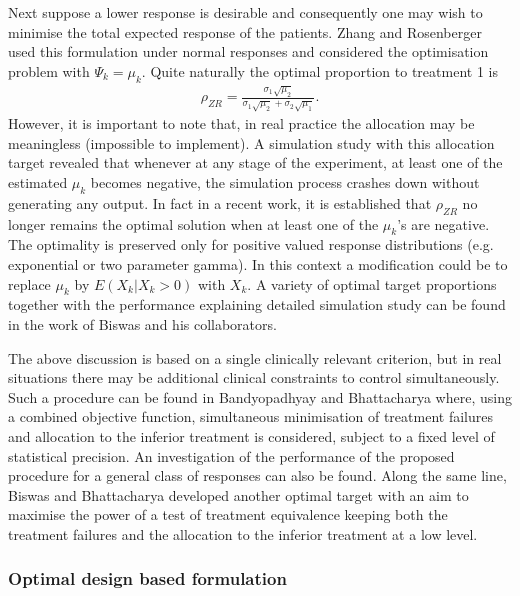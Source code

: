 Next suppose a lower response is desirable and consequently one may
wish to minimise the total expected response of the patients. Zhang
and Rosenberger\cite{24} used this formulation under normal responses
and considered the optimisation problem with $\Psi_{k}=\mu_{k}$.
Quite naturally the optimal proportion to treatment 1 is
\begin{eqnarray*}
\rho_{ZR}=\frac{\sigma_{1}\sqrt{\mu_{2}}}{\sigma_{1}\sqrt{\mu_{2}}+\sigma_{2}\sqrt{\mu_{1}}}.
\end{eqnarray*}
However, it is important to note that, in real practice the
allocation may be meaningless (impossible to implement). A simulation study with this allocation target revealed that  whenever at any stage of the experiment, at least one of
the estimated $\mu_{k}$ becomes negative, the simulation process crashes down without generating any output\cite{43}. In fact in a recent work\cite{32}, it is established that $\rho_{ZR}$
no longer remains the optimal solution when at least one of the
$\mu_{k}$'s are negative. The optimality is preserved only for positive valued response
distributions (e.g. exponential or two parameter gamma). In
this context a modification\cite{43} could be to replace $\mu_{k}$ by $E(X_{k}|X_{k}>0)$ with $X_{k}$. A variety of optimal target proportions together with the performance explaining detailed simulation study
can be found in the work of Biswas and his collaborators\cite{43}.

The above discussion is based on a single clinically relevant criterion, but in real situations there may be additional clinical constraints to control simultaneously. Such a procedure can be found in Bandyopadhyay and Bhattacharya\cite{45} where, using a combined objective function, simultaneous minimisation of treatment failures and allocation to the inferior treatment is considered, subject to a fixed level of statistical precision. An investigation of the performance of the proposed procedure for a general class of responses can also be found. Along the same line, Biswas and Bhattacharya\cite{46} developed another optimal target with an aim to maximise the power of a test of treatment equivalence keeping both the treatment failures and the allocation to the inferior treatment at a low level.

\subsubsection{Optimal design based formulation}

